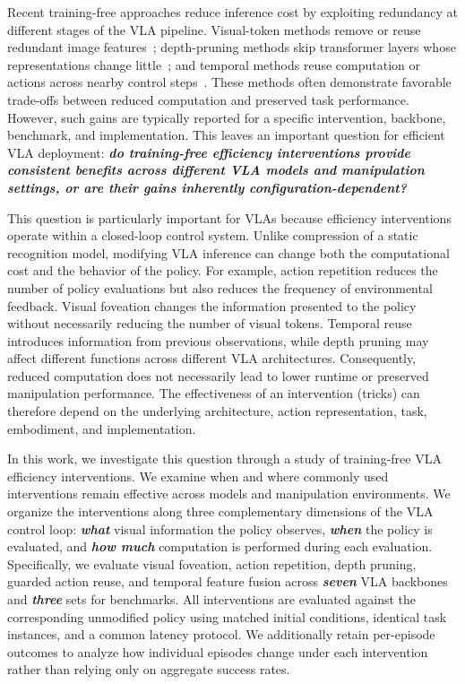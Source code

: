 \documentclass[letterpaper, 10 pt, conference]{ieeeconf}
\begin{document}
Recent training-free approaches reduce inference cost by exploiting redundancy at different stages of the VLA pipeline. Visual-token methods remove or reuse redundant image features~\cite{fastv,vlacache,vlapruner}; depth-pruning methods skip transformer layers whose representations change little~\cite{shortgpt,efficientvla}; and temporal methods reuse computation or actions across nearby control steps~\cite{vlacache,flashvla,ttfvla}. These methods often demonstrate favorable trade-offs between reduced computation and preserved task performance. However, such gains are typically reported for a specific intervention, backbone, benchmark, and implementation. This leaves an important question for efficient VLA deployment: \textbf{\emph{do training-free efficiency interventions provide consistent benefits across different VLA models and manipulation settings, or are their gains inherently configuration-dependent?}}

This question is particularly important for VLAs because efficiency interventions operate within a closed-loop control system. Unlike compression of a static recognition model, modifying VLA inference can change both the computational cost and the behavior of the policy. For example, action repetition reduces the number of policy evaluations but also reduces the frequency of environmental feedback. Visual foveation changes the information presented to the policy without necessarily reducing the number of visual tokens. Temporal reuse introduces information from previous observations, while depth pruning may affect different functions across different VLA architectures. Consequently, reduced computation does not necessarily lead to lower runtime or preserved manipulation performance. The effectiveness of an intervention (tricks) can therefore depend on the underlying architecture, action representation, task, embodiment, and implementation.

In this work, we investigate this question through a study of training-free VLA efficiency interventions. We examine when and where commonly used interventions remain effective across models and manipulation environments. We organize the interventions along three complementary dimensions of the VLA control loop: \textbf{\emph{what}} visual information the policy observes, \textbf{\emph{when}} the policy is evaluated, and \textbf{\emph{how much}} computation is performed during each evaluation. Specifically, we evaluate visual foveation, action repetition, depth pruning, guarded action reuse, and temporal feature fusion across \textit{\textbf{seven}} VLA backbones and \textbf{\textit{three}} sets for benchmarks. All interventions are evaluated against the corresponding unmodified policy using matched initial conditions, identical task instances, and a common latency protocol. We additionally retain per-episode outcomes to analyze how individual episodes change under each intervention rather than relying only on aggregate success rates.
\end{document}
